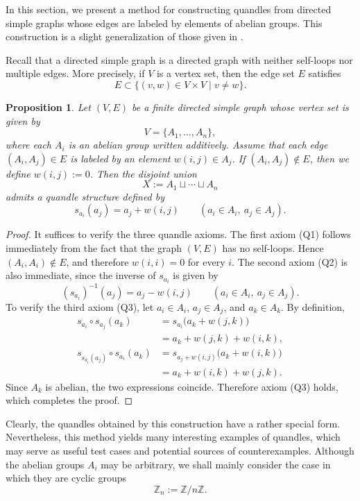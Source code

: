 \documentclass[12pt]{amsart}
\newtheorem{Prop}{Proposition}[section]
\theoremstyle{definition}
\newcommand{\Z}{{\mathbb Z}}
\begin{document}
In this section, we present a method for constructing quandles from directed simple graphs 
whose edges are labeled by elements of abelian groups. 
This construction is a slight generalization of those given in \cite{FT,SS}. 

Recall that a directed simple graph is a directed graph with neither self-loops nor multiple edges.
More precisely, if $V$ is a vertex set, then the edge set $E$ satisfies
\[
E \subset \{ (v,w) \in V \times V \mid v \neq w \}.
\]

\begin{Prop}
Let $(V,E)$ be a finite directed simple graph whose vertex set is given by
\[
V=\{A_1,\ldots,A_n\},
\]
where each $A_i$ is an abelian group written additively.
Assume that each edge $(A_i,A_j)\in E$ is labeled by an element $w(i,j)\in A_j$.
If $(A_i,A_j)\notin E$, then we define $w(i,j):=0$.
Then the disjoint union
\[
X:=A_1 \sqcup \cdots \sqcup A_n
\]
admits a quandle structure defined by
\[
s_{a_i}(a_j)=a_j+w(i,j)
\qquad
(a_i\in A_i,\ a_j\in A_j).
\]
\end{Prop}

\begin{proof}
It suffices to verify the three quandle axioms.
The first axiom (Q1) follows immediately from the fact that the graph $(V,E)$ has no self-loops. 
Hence $(A_i,A_i)\notin E$, and therefore $w(i,i)=0$ for every $i$. 
The second axiom (Q2) is also immediate, since the inverse of $s_{a_i}$ is given by 
\[
(s_{a_i})^{-1}(a_j)=a_j-w(i,j)
\qquad
(a_i\in A_i,\ a_j\in A_j).
\]
To verify the third axiom (Q3), let $a_i\in A_i$, $a_j\in A_j$, and $a_k\in A_k$.
By definition,
\begin{align*}
s_{a_i}\circ s_{a_j}(a_k)
&=
s_{a_i}\bigl(a_k+w(j,k)\bigr) \\
&=
a_k+w(j,k)+w(i,k),
\\
s_{s_{a_i}(a_j)}\circ s_{a_i}(a_k)
&=
s_{a_j+w(i,j)}\bigl(a_k+w(i,k)\bigr) \\
&=
a_k+w(i,k)+w(j,k).
\end{align*}
Since $A_k$ is abelian, the two expressions coincide.
Therefore axiom (Q3) holds, which completes the proof.
\end{proof}

Clearly, the quandles obtained by this construction have a rather special form.
Nevertheless, this method yields many interesting examples of quandles, which may serve as useful test cases and potential sources of counterexamples.
Although the abelian groups $A_i$ may be arbitrary, we shall mainly consider the case in which they are cyclic groups
\[
\Z_n := \Z / n\Z.
\]
\end{document}
